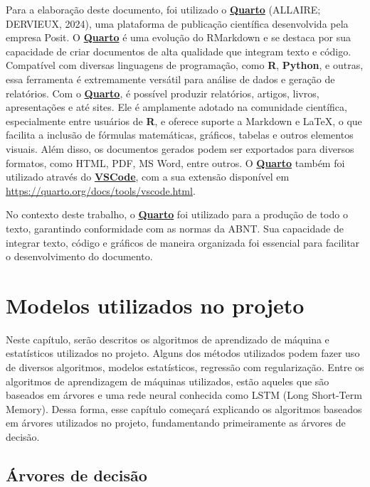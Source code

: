 \documentclass[
  12pt,
  a4paper,
]{scrreprt}
\begin{document}
Para a elaboração deste documento, foi utilizado o
\href{https://quarto.org/}{\textbf{Quarto}} (ALLAIRE; DERVIEUX, 2024),
uma plataforma de publicação científica desenvolvida pela empresa Posit.
O \href{https://quarto.org/}{\textbf{Quarto}} é uma evolução do
RMarkdown e se destaca por sua capacidade de criar documentos de alta
qualidade que integram texto e código. Compatível com diversas
linguagens de programação, como \textbf{R}, \textbf{Python}, e outras,
essa ferramenta é extremamente versátil para análise de dados e geração
de relatórios. Com o \href{https://quarto.org/}{\textbf{Quarto}}, é
possível produzir relatórios, artigos, livros, apresentações e até
sites. Ele é amplamente adotado na comunidade científica, especialmente
entre usuários de \textbf{R}, e oferece suporte a Markdown e \LaTeX, o
que facilita a inclusão de fórmulas matemáticas, gráficos, tabelas e
outros elementos visuais. Além disso, os documentos gerados podem ser
exportados para diversos formatos, como HTML, PDF, MS Word, entre
outros. O \href{https://quarto.org/}{\textbf{Quarto}} também foi
utilizado através do
\href{https://code.visualstudio.com/}{\textbf{VSCode}}, com a sua
extensão disponível em \url{https://quarto.org/docs/tools/vscode.html}.

\vspace{12pt}

No contexto deste trabalho, o
\href{https://quarto.org/}{\textbf{Quarto}} foi utilizado para a
produção de todo o texto, garantindo conformidade com as normas da ABNT.
Sua capacidade de integrar texto, código e gráficos de maneira
organizada foi essencial para facilitar o desenvolvimento do documento.

\chapter{Modelos utilizados no
projeto}\label{modelos-utilizados-no-projeto}

Neste capítulo, serão descritos os algoritmos de aprendizado de máquina
e estatísticos utilizados no projeto. Alguns dos métodos utilizados
podem fazer uso de diversos algoritmos, modelos estatísticos, regressão
com regularização. Entre os algoritmos de aprendizagem de máquinas
utilizados, estão aqueles que são baseados em árvores e uma rede neural
conhecida como LSTM (Long Short-Term Memory). Dessa forma, esse capítulo
começará explicando os algoritmos baseados em árvores utilizados no
projeto, fundamentando primeiramente as árvores de decisão.

\section{Árvores de decisão}\label{uxe1rvores-de-decisuxe3o}
\end{document}
